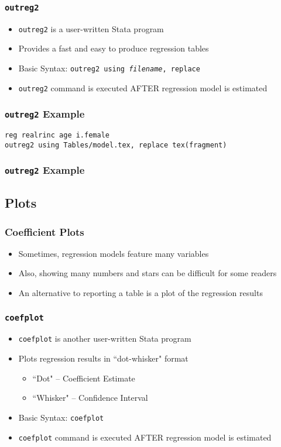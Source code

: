 \documentclass{beamer}
\begin{document}
\begin{frame}
	\frametitle{\texttt{outreg2}}
		\begin{itemize}
			\item \texttt{outreg2} is a user-written Stata program
			\item Provides a fast and easy to produce regression tables
			\item Basic Syntax: \texttt{outreg2 using \textit{filename}, replace}
			\item \texttt{outreg2} command is executed AFTER regression model is estimated
		\end{itemize}
\end{frame}

\begin{frame}
	\frametitle{\texttt{outreg2} Example}
		\texttt{reg realrinc age i.female}\\
		\texttt{outreg2 using Tables/model.tex, replace tex(fragment)}
\end{frame}

\begin{frame}
	\frametitle{\texttt{outreg2} Example}
\end{frame}

\subsection{Plots}

\begin{frame}
	\frametitle{Coefficient Plots}
		\begin{itemize}
			\item Sometimes, regression models feature many variables
			\item Also, showing many numbers and stars can be difficult for some readers
			\item An alternative to reporting a table is a plot of the regression results
		\end{itemize}
\end{frame}

\begin{frame}
	\frametitle{\texttt{coefplot}}
		\begin{itemize}
			\item \texttt{coefplot} is another user-written Stata program
			\item Plots regression results in ``dot-whisker" format
				\begin{itemize}
					\item ``Dot" -- Coefficient Estimate
					\item ``Whisker" -- Confidence Interval
				\end{itemize}
			\item Basic Syntax: \texttt{coefplot}
			\item \texttt{coefplot} command is executed AFTER regression model is estimated
		\end{itemize}
\end{frame}
\end{document}
